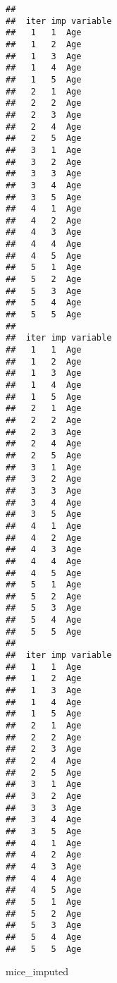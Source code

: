 \documentclass[
]{article}
\newenvironment{Shaded}{\begin{snugshade}}{\end{snugshade}}
\newcommand{\AttributeTok}[1]{\textcolor[rgb]{0.13,0.29,0.53}{#1}}
\newcommand{\FunctionTok}[1]{\textcolor[rgb]{0.13,0.29,0.53}{\textbf{#1}}}
\newcommand{\NormalTok}[1]{#1}
\newcommand{\OtherTok}[1]{\textcolor[rgb]{0.56,0.35,0.01}{#1}}
\newcommand{\SpecialCharTok}[1]{\textcolor[rgb]{0.81,0.36,0.00}{\textbf{#1}}}
\newcommand{\StringTok}[1]{\textcolor[rgb]{0.31,0.60,0.02}{#1}}
\begin{document}
\begin{Shaded}
\end{Shaded}

\begin{verbatim}
## 
##  iter imp variable
##   1   1  Age
##   1   2  Age
##   1   3  Age
##   1   4  Age
##   1   5  Age
##   2   1  Age
##   2   2  Age
##   2   3  Age
##   2   4  Age
##   2   5  Age
##   3   1  Age
##   3   2  Age
##   3   3  Age
##   3   4  Age
##   3   5  Age
##   4   1  Age
##   4   2  Age
##   4   3  Age
##   4   4  Age
##   4   5  Age
##   5   1  Age
##   5   2  Age
##   5   3  Age
##   5   4  Age
##   5   5  Age
## 
##  iter imp variable
##   1   1  Age
##   1   2  Age
##   1   3  Age
##   1   4  Age
##   1   5  Age
##   2   1  Age
##   2   2  Age
##   2   3  Age
##   2   4  Age
##   2   5  Age
##   3   1  Age
##   3   2  Age
##   3   3  Age
##   3   4  Age
##   3   5  Age
##   4   1  Age
##   4   2  Age
##   4   3  Age
##   4   4  Age
##   4   5  Age
##   5   1  Age
##   5   2  Age
##   5   3  Age
##   5   4  Age
##   5   5  Age
## 
##  iter imp variable
##   1   1  Age
##   1   2  Age
##   1   3  Age
##   1   4  Age
##   1   5  Age
##   2   1  Age
##   2   2  Age
##   2   3  Age
##   2   4  Age
##   2   5  Age
##   3   1  Age
##   3   2  Age
##   3   3  Age
##   3   4  Age
##   3   5  Age
##   4   1  Age
##   4   2  Age
##   4   3  Age
##   4   4  Age
##   4   5  Age
##   5   1  Age
##   5   2  Age
##   5   3  Age
##   5   4  Age
##   5   5  Age
\end{verbatim}

\begin{Shaded}
\begin{Highlighting}[]
\NormalTok{mice\_imputed }
\end{Highlighting}
\end{Shaded}
\end{document}
